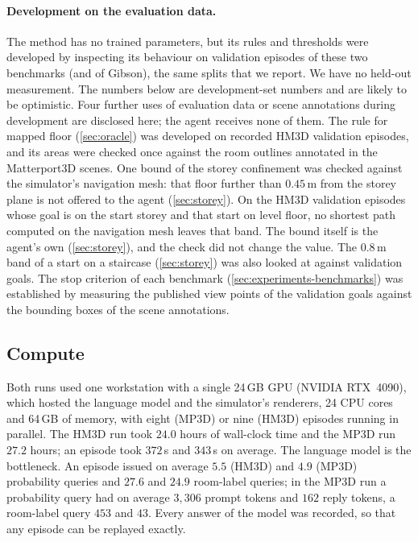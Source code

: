 \documentclass[10pt]{article}
\newcommand{\m}{\,\mathrm{m}}
\begin{document}
\paragraph{Development on the evaluation data.} The method has no trained
parameters, but its rules and thresholds were developed by inspecting its
behaviour on validation episodes of these two benchmarks (and of Gibson), the
same splits that we report. We have no held-out measurement. The numbers below
are development-set numbers and are likely to be optimistic. Four further
uses of evaluation data or scene annotations during development are disclosed
here; the agent receives none of them. The rule for mapped floor
(\cref{sec:oracle}) was developed on recorded HM3D validation episodes, and
its areas were checked once against the room outlines annotated in the
Matterport3D scenes. One bound of the storey confinement was checked against
the simulator's navigation mesh: that floor further than $0.45\m$ from the
storey plane is not offered to the agent (\cref{sec:storey}). On the HM3D
validation episodes whose goal is on the start storey and that start on level
floor, no shortest path computed on the navigation mesh leaves that band. The
bound itself is the agent's own (\cref{sec:storey}), and the check did not
change the value. The $0.8\m$ band of a start on a staircase
(\cref{sec:storey}) was also looked at against validation goals. The stop
criterion of each benchmark
(\cref{sec:experiments-benchmarks}) was established by measuring the published
view points of the validation goals against the bounding boxes of the scene
annotations.

\subsection{Compute}\label{sec:experiments-compute}
Both runs used one workstation with a single 24\,GB GPU (NVIDIA RTX~4090),
which hosted the language model and the simulator's renderers, 24 CPU cores and
64\,GB of memory, with eight (MP3D) or nine (HM3D) episodes running in
parallel. The HM3D run took $24.0$ hours of wall-clock time and the MP3D run
$27.2$ hours; an episode took $372$\,s and $343$\,s on average. The language
model is the bottleneck. An episode issued on average $5.5$ (HM3D) and $4.9$
(MP3D) probability queries and $27.6$ and $24.9$ room-label queries; in the
MP3D run a probability query had on average $3{,}306$ prompt tokens and $162$
reply tokens, a room-label query $453$ and $43$. Every answer of the model was
recorded, so that any episode can be replayed exactly.
\end{document}
